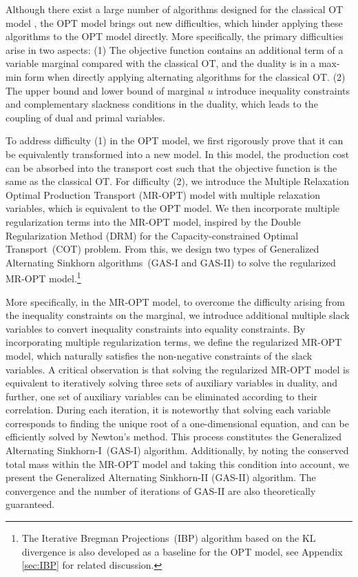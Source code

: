 \documentclass[review,hidelinks,onefignum,onetabnum]{siamart220329}
\begin{document}
Although there exist a large number of algorithms designed for the classical OT model \cite{peyre2017computational, IBP}, the OPT model brings out new difficulties, which hinder applying these algorithms to the OPT model directly. More specifically, the primary difficulties arise in two aspects: (1) The objective function contains an additional term of a variable marginal compared with the classical OT, and the duality is in a max-min form when directly applying alternating algorithms for the classical OT. (2) The upper bound and lower bound of marginal $u$ introduce inequality constraints and complementary slackness conditions in the duality, which leads to the coupling of dual and primal variables.

To address difficulty (1) in the OPT model, we first rigorously prove that it can be equivalently transformed into a new model. In this model, the production cost can be absorbed into the transport cost such that the objective function is the same as the classical OT. 
For difficulty (2), we introduce the Multiple Relaxation Optimal Production Transport (MR-OPT) model with multiple relaxation variables, which is equivalent to the OPT model. 
We then incorporate multiple regularization terms into the MR-OPT model, inspired by the Double Regularization Method (DRM) \cite{wu2022double} for the Capacity-constrained Optimal Transport~(COT) problem.
From this, we design two types of Generalized Alternating Sinkhorn algorithms~(GAS-I and GAS-II) to solve the regularized MR-OPT model.\footnote{The Iterative Bregman Projections~(IBP) algorithm \cite{IBP} based on the KL divergence is also developed as a baseline for the OPT model, see Appendix \ref{sec:IBP} for related discussion.}

More specifically, in the MR-OPT model, to overcome the difficulty arising from the inequality constraints on the marginal, we introduce additional multiple slack variables to convert inequality constraints into equality constraints. 
By incorporating multiple regularization terms, we define the regularized MR-OPT model, which naturally satisfies the non-negative constraints of the slack variables. 
A critical observation is that solving the regularized MR-OPT model is equivalent to iteratively solving three sets of auxiliary variables in duality, and further, one set of auxiliary variables can be eliminated according to their correlation. 
During each iteration, it is noteworthy that solving each variable corresponds to finding the unique root of a one-dimensional equation, and can be efficiently solved by Newton's method. 
This process constitutes the Generalized Alternating Sinkhorn-I~(GAS-I) algorithm. 
Additionally, by noting the conserved total mass within the MR-OPT model and taking this condition into account, we present the Generalized Alternating Sinkhorn-II (GAS-II) algorithm.   
The convergence and the number of iterations of GAS-II are also theoretically guaranteed.
\end{document}
